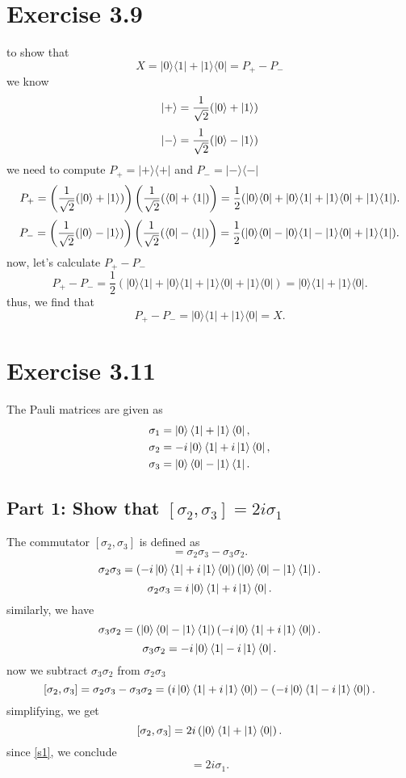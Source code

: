 \documentclass[12pt]{article}
\begin{document}
\section*{Exercise 3.9}
to show that 
\[
X = |0\rangle \langle 1| + |1\rangle \langle 0| = P_+ - P_-
\]
we know
\[
\ket{+} = \frac{1}{\sqrt{2}} (\ket{0} + \ket{1})
\]
\[
\ket{-} = \frac{1}{\sqrt{2}} (\ket{0} - \ket{1})
\]
we need to compute \( P_+ = |+\rangle \langle +| \) and \( P_- = |-\rangle \langle -| \)
\[
P_+ = \left( \frac{1}{\sqrt{2}} (\ket{0} + \ket{1}) \right) \left( \frac{1}{\sqrt{2}} (\bra{0} + \bra{1}) \right) = \frac{1}{2} (|0\rangle \langle 0| + |0\rangle \langle 1| + |1\rangle \langle 0| + |1\rangle \langle 1|).
\]
\[
P_- = \left( \frac{1}{\sqrt{2}} (\ket{0} - \ket{1}) \right) \left( \frac{1}{\sqrt{2}} (\bra{0} - \bra{1}) \right) = \frac{1}{2} (|0\rangle \langle 0| - |0\rangle \langle 1| - |1\rangle \langle 0| + |1\rangle \langle 1|).
\]
now, let's calculate \( P_+ - P_- \)
\[
P_+ - P_- =  \frac{1}{2} (|0\rangle \langle 1| + |0\rangle \langle 1| + |1\rangle \langle 0| + |1\rangle \langle 0|) = |0\rangle \langle 1| + |1\rangle \langle 0|.
\]
thus, we find that
\[
P_+ - P_- = |0\rangle \langle 1| + |1\rangle \langle 0| = X.
\]

\section*{Exercise 3.11}
The Pauli matrices are given as
\begin{align}
\sigma_1 &= \ket{0}\bra{1} + \ket{1}\bra{0}, \label{s1} \\
\sigma_2 &= -i \ket{0}\bra{1} + i \ket{1}\bra{0}, \label{s2} \\
\sigma_3 &= \ket{0}\bra{0} - \ket{1}\bra{1}. \label{s3}
\end{align}

\subsection*{Part 1: Show that \( [ \sigma_2, \sigma_3 ] = 2i \sigma_1 \)}

The commutator \( [ \sigma_2, \sigma_3 ] \) is defined as
\begin{equation}
[ \sigma_2, \sigma_3 ] = \sigma_2 \sigma_3 - \sigma_3 \sigma_2.
\end{equation}
\[
\sigma_2 \sigma_3 = \left( -i \ket{0}\bra{1} + i \ket{1}\bra{0} \right) \left( \ket{0}\bra{0} - \ket{1}\bra{1} \right).
\]
\[
\sigma_2 \sigma_3 = i \ket{0}\bra{1} + i \ket{1}\bra{0}.
\]
similarly, we have
\[
\sigma_3 \sigma_2 = \left( \ket{0}\bra{0} - \ket{1}\bra{1} \right) \left( -i \ket{0}\bra{1} + i \ket{1}\bra{0} \right).
\]
\[
\sigma_3 \sigma_2 = -i \ket{0}\bra{1} - i \ket{1}\bra{0}.
\]
now we subtract \(\sigma_3 \sigma_2\) from \(\sigma_2 \sigma_3\)
\[
[ \sigma_2, \sigma_3 ] = \sigma_2 \sigma_3 - \sigma_3 \sigma_2 = \left( i \ket{0}\bra{1} + i \ket{1}\bra{0} \right) - \left( -i \ket{0}\bra{1} - i \ket{1}\bra{0} \right).
\]
simplifying, we get
\[
[ \sigma_2, \sigma_3 ] = 2i \left( \ket{0}\bra{1} + \ket{1}\bra{0} \right).
\]
since \ref{s1}, we conclude
\begin{equation}
[ \sigma_2, \sigma_3 ] = 2i \sigma_1.
\end{equation}
\end{document}
